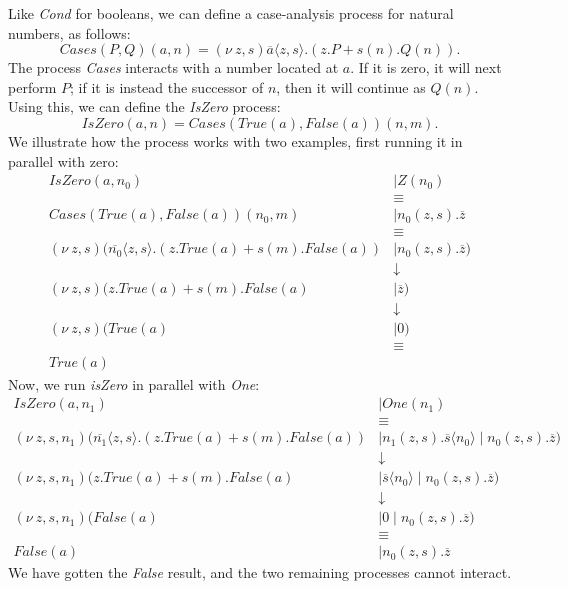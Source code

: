 \documentclass[a4paper, openany]{memoir}
\theoremstyle{definition}
\begin{document}
    Like \textit{Cond} for booleans, we can define a case-analysis process for natural numbers, as follows:
    \[\textit{Cases}(P, Q)(a, n) = (\nu \ z, s)\overline{a} \langle z, s \rangle.(z.P + s(n).Q(n)).\]
    The process \textit{Cases} interacts with a number located at $a$. If it is zero, it will next perform $P$; if it is instead the successor of $n$, then it will continue as $Q(n)$. Using this, we can define the \textit{IsZero} process:
    \[\textit{IsZero}(a, n) = \textit{Cases}(\textit{True}(a), \textit{False}(a))(n, m).\]
    We illustrate how the process works with two examples, first running it in parallel with zero:
    \begin{align*}
        \textit{IsZero}(a, n_0) &\mid Z(n_0) \\
        &\equiv \\
        \textit{Cases}(\textit{True}(a), \textit{False}(a))(n_0, m) &\mid n_0(z, s).\overline{z} \\
        &\equiv \\
        (\nu \ z, s)(\overline{n_0} \langle z, s \rangle.(z.\textit{True}(a) + s(m).\textit{False}(a)) &\mid n_0(z, s).\overline{z}) \\
        &\downarrow \\
        (\nu \ z, s)(z.\textit{True}(a) + s(m).\textit{False}(a) &\mid \overline{z}) \\
        &\downarrow \\
        (\nu \ z, s)(\textit{True}(a) &\mid 0) \\
        &\equiv \\
        \textit{True}(a)
    \end{align*}
    Now, we run \textit{isZero} in parallel with \textit{One}:
    \begin{align*}
        \textit{IsZero}(a, n_1) &\mid \textit{One}(n_1) \\
        &\equiv \\
        (\nu \ z, s, n_1)(\overline{n_1} \langle z, s \rangle.(z.\textit{True}(a) + s(m).\textit{False}(a)) &\mid n_1(z, s). \overline{s} \langle n_0 \rangle \mid n_0(z, s).\overline{z}) \\
        &\downarrow \\
        (\nu \ z, s, n_1)(z.\textit{True}(a) + s(m).\textit{False}(a) &\mid \overline{s} \langle n_0 \rangle \mid n_0(z, s).\overline{z}) \\
        &\downarrow \\
        (\nu \ z, s, n_1)(\textit{False}(a) &\mid 0 \mid n_0(z, s).\overline{z}) \\
        &\equiv \\
        \textit{False}(a) &\mid n_0(z, s).\overline{z}
    \end{align*}
    We have gotten the \textit{False} result, and the two remaining processes cannot interact.
\end{document}
